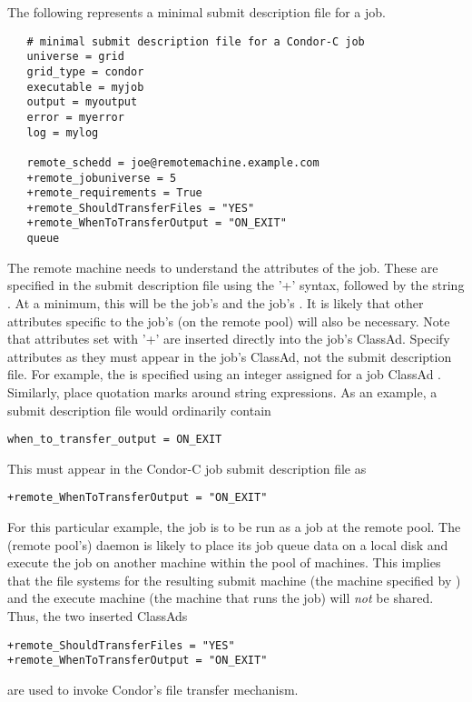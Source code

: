 The following represents a minimal submit description file for
a job.

\footnotesize
\begin{verbatim}
   # minimal submit description file for a Condor-C job
   universe = grid
   grid_type = condor
   executable = myjob
   output = myoutput
   error = myerror
   log = mylog

   remote_schedd = joe@remotemachine.example.com
   +remote_jobuniverse = 5
   +remote_requirements = True
   +remote_ShouldTransferFiles = "YES"
   +remote_WhenToTransferOutput = "ON_EXIT"
   queue
\end{verbatim}
\normalsize

The remote machine needs to understand the attributes of the job.
These are specified in the submit description file using the '+'
syntax, followed by the string .
At a minimum, this will be the job's  and the job's
.
It is likely that other attributes specific to the
job's  (on the remote pool) will also be necessary.
Note that attributes set with '+' are inserted directly into
the job's ClassAd.  
Specify attributes as they 
must appear in the job's ClassAd, not the submit description file. 
For example,
the  is specified using an integer assigned for
a job ClassAd .
Similarly, place quotation marks around string 
expressions.
As an example, a submit description file would ordinarily contain
\footnotesize
\begin{verbatim}
when_to_transfer_output = ON_EXIT
\end{verbatim}
\normalsize
This must appear in the Condor-C job submit description file as
\footnotesize
\begin{verbatim}
+remote_WhenToTransferOutput = "ON_EXIT"
\end{verbatim}
\normalsize

For this particular example,
the job is to be run as a  
 job at the remote pool.
The (remote pool's)  daemon is likely to
place its job queue data on a local disk 
and execute the job on another machine within the pool of machines.
This implies that the file systems for the resulting submit machine
(the machine specified by ) and
the execute machine (the machine that runs the job) will
\emph{not} be shared.
Thus,
the two inserted ClassAds
\footnotesize
\begin{verbatim}
+remote_ShouldTransferFiles = "YES"
+remote_WhenToTransferOutput = "ON_EXIT"
\end{verbatim}
\normalsize
are used to invoke Condor's file transfer mechanism. 



